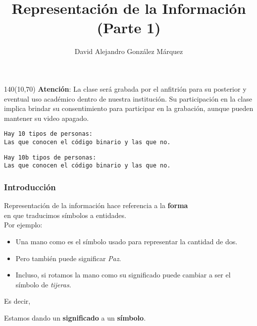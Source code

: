 \documentclass[aspectratio=169]{beamer}
\title{\Huge Representación de la Información\\ \Large (Parte 1)}
\author{David Alejandro González Márquez}
\date{}
\begin{document}
\begin{frame}[plain]
    \titlepage
    \begin{textblock}{140}(10,70)
    \textcolor{rojo}{
    \textbf{Atención}: La clase será grabada por el anfitrión para su posterior y eventual uso académico dentro de nuestra institución. Su participación en la clase implica brindar su consentimiento para participar en la grabación, aunque pueden mantener su video apagado.}
    \end{textblock}
\end{frame}

\begin{frame}[plain]
    \texttt{Hay 10 tipos de personas:}\\
    \vspace{10px}
    \hspace{1cm}\texttt{Las que conocen el código binario y las que no.}
\end{frame}

\begin{frame}[plain]
    \texttt{Hay 10b tipos de personas:}\\
    \vspace{10px}
    \hspace{1cm}\texttt{Las que conocen el código binario y las que no.}
\end{frame}

\begin{frame}[fragile]
    \frametitle{Introducción}
    Representación de la información hace referencia a la \textbf{forma}\\ en que traducimos símbolos a entidades.\\
    \vspace{5px}
    Por ejemplo: %
    \begin{itemize}
     \item Una mano como \faHandPeaceO \xspace es el símbolo usado para representar la cantidad de dos.
     \item Pero también puede significar \emph{Paz}.
     \item Incluso, si rotamos la mano como \faHandScissorsO \xspace su significado puede cambiar a ser el símbolo de \emph{tijeras}.
    \end{itemize}
    \vspace{12px}
    Es decir,
    \vspace{-12px}
    \begin{block}{\vspace*{-3ex}}
    Estamos dando un \textbf{significado} a un \textbf{símbolo}.
    \end{block}
\end{frame}
\end{document}

